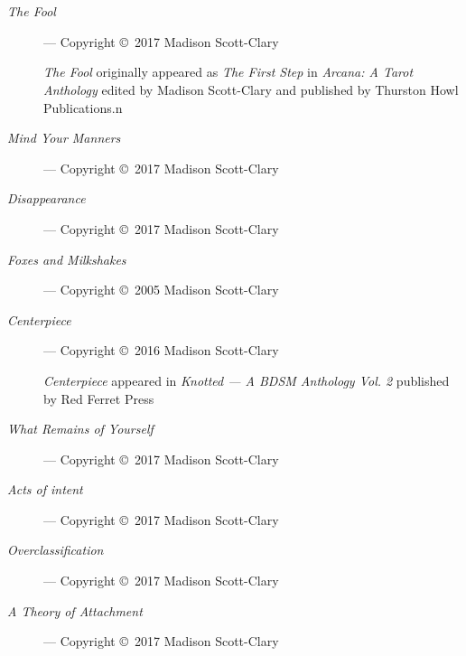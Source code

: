 \chapter*{}

\begin{description}
    \item[\emph{The Fool}]
    --- Copyright \copyright\ 2017 Madison Scott-Clary

    \emph{The Fool} originally appeared as \emph{The First Step} in \emph{Arcana: A Tarot Anthology} edited by Madison Scott-Clary and published by Thurston Howl Publications.n
    \item[\emph{Mind Your Manners}]
    --- Copyright \copyright\ 2017 Madison Scott-Clary
    \item[\emph{Disappearance}]
    --- Copyright \copyright\ 2017 Madison Scott-Clary
    \item[\emph{Foxes and Milkshakes}]
    --- Copyright \copyright\ 2005 Madison Scott-Clary
    \item[\emph{Centerpiece}]
    --- Copyright \copyright\ 2016 Madison Scott-Clary

    \emph{Centerpiece} appeared in \emph{Knotted --- A BDSM Anthology Vol. 2} published by Red Ferret Press
    \item[\emph{What Remains of Yourself}]
    --- Copyright \copyright\ 2017 Madison Scott-Clary
    \item[\emph{Acts of intent}]
    --- Copyright \copyright\ 2017 Madison Scott-Clary
    \item[\emph{Overclassification}]
    --- Copyright \copyright\ 2017 Madison Scott-Clary
    \item[\emph{A Theory of Attachment}]
    --- Copyright \copyright\ 2017 Madison Scott-Clary
\end{description}
